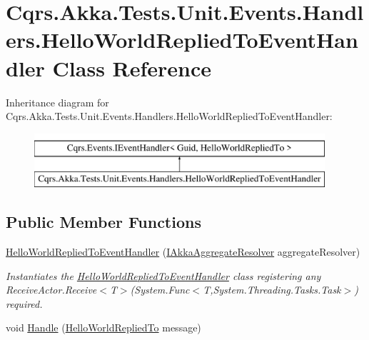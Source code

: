 \hypertarget{classCqrs_1_1Akka_1_1Tests_1_1Unit_1_1Events_1_1Handlers_1_1HelloWorldRepliedToEventHandler}{}\section{Cqrs.\+Akka.\+Tests.\+Unit.\+Events.\+Handlers.\+Hello\+World\+Replied\+To\+Event\+Handler Class Reference}
\label{classCqrs_1_1Akka_1_1Tests_1_1Unit_1_1Events_1_1Handlers_1_1HelloWorldRepliedToEventHandler}
Inheritance diagram for Cqrs.\+Akka.\+Tests.\+Unit.\+Events.\+Handlers.\+Hello\+World\+Replied\+To\+Event\+Handler\+:\begin{figure}[H]
\begin{center}
\leavevmode
\includegraphics[height=2.000000cm]{classCqrs_1_1Akka_1_1Tests_1_1Unit_1_1Events_1_1Handlers_1_1HelloWorldRepliedToEventHandler}
\end{center}
\end{figure}
\subsection*{Public Member Functions}
\begin{DoxyCompactItemize}
\item 
\hyperlink{classCqrs_1_1Akka_1_1Tests_1_1Unit_1_1Events_1_1Handlers_1_1HelloWorldRepliedToEventHandler_aa566f26a38bc21ed270a1854de47408d_aa566f26a38bc21ed270a1854de47408d}{Hello\+World\+Replied\+To\+Event\+Handler} (\hyperlink{interfaceCqrs_1_1Akka_1_1Domain_1_1IAkkaAggregateResolver}{I\+Akka\+Aggregate\+Resolver} aggregate\+Resolver)
\begin{DoxyCompactList}\small\item\em Instantiates the \hyperlink{classCqrs_1_1Akka_1_1Tests_1_1Unit_1_1Events_1_1Handlers_1_1HelloWorldRepliedToEventHandler}{Hello\+World\+Replied\+To\+Event\+Handler} class registering any Receive\+Actor.\+Receive$<$\+T$>$(\+System.\+Func$<$\+T,\+System.\+Threading.\+Tasks.\+Task$>$) required. \end{DoxyCompactList}\item 
void \hyperlink{classCqrs_1_1Akka_1_1Tests_1_1Unit_1_1Events_1_1Handlers_1_1HelloWorldRepliedToEventHandler_a12509fd1219657eca78496775641f481_a12509fd1219657eca78496775641f481}{Handle} (\hyperlink{classCqrs_1_1Akka_1_1Tests_1_1Unit_1_1Events_1_1HelloWorldRepliedTo}{Hello\+World\+Replied\+To} message)
\end{DoxyCompactItemize}
